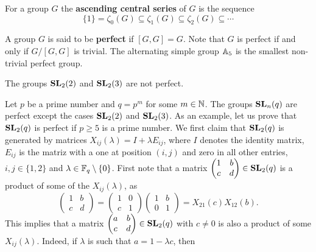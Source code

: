 For a group $G$ the \textbf{ascending central series} of $G$ is the sequence 
\[
	\{1\}=\zeta_0(G)\subseteq\zeta_1(G)\subseteq\zeta_2(G)\subseteq\cdots
\]

A group $G$ is said to be \textbf{perfect} if $[G,G]=G$. Note that
$G$ is perfect if and only if $G/[G,G]$ is trivial. The alternating 
simple group $\mathbb{A}_5$ is the smallest non-trivial perfect group. 

\begin{example}
The groups $\mathbf{SL}_2(2)$ and $\mathbf{SL}_2(3)$ are not perfect. 	
\end{example}

Let $p$ be a prime number and $q=p^m$ for some $m\in\mathbb{N}$.  
The groups $\mathbf{SL}_n(q)$ are perfect except the cases $\mathbf{SL}_2(2)$ and $\mathbf{SL}_2(3)$. As an example,
let us prove that $\mathbf{SL}_2(q)$ is perfect if $p\geq5$ is a prime number. We first 
claim that $\mathbf{SL}_2(q)$ is generated by matrices
$X_{ij}(\lambda)=I+\lambda E_{ij}$, where $I$ denotes the identity matrix, 
$E_{ij}$ is the matriz with a one at position $(i,j)$ and zero in all other entries, 
$i,j\in\{1,2\}$ and $\lambda\in\mathbb{F}_q\setminus\{0\}$. First note that
a matrix $\begin{pmatrix}1&b\\c&d\end{pmatrix}\in\mathbf{SL}_2(q)$ is 
a product of some of the $X_{ij}(\lambda)$, as 
\[
\begin{pmatrix}
1&b\\
c&d	
\end{pmatrix}
=\begin{pmatrix}
1&0\\
c&1
\end{pmatrix}
\begin{pmatrix}
1&b\\
0&1	
\end{pmatrix}
=X_{21}(c)X_{12}(b).
\]
This implies that a matrix $\begin{pmatrix}a&b\\c&d\end{pmatrix}\in\mathbf{SL}_2(q)$ 
with $c\ne 0$ is also a product
of some $X_{ij}(\lambda)$. Indeed, if
$\lambda$ is such that $a=1-\lambda c$, then
